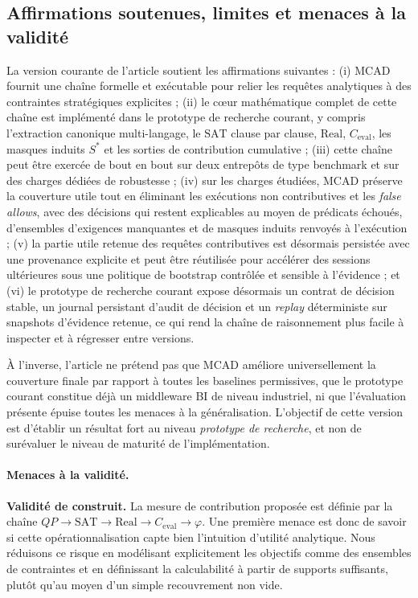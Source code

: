 \documentclass[journal]{IEEEtran}
\begin{document}
\subsection{Affirmations soutenues, limites et menaces à la validité}

La version courante de l'article soutient les affirmations suivantes : (i) MCAD fournit une chaîne formelle et exécutable pour relier les requêtes analytiques à des contraintes stratégiques explicites ; (ii) le cœur mathématique complet de cette chaîne est implémenté dans le prototype de recherche courant, y compris l'extraction canonique multi-langage, le $\mathrm{SAT}$ clause par clause, $\mathrm{Real}$, $C_{\mathrm{eval}}$, les masques induits $S^*$ et les sorties de contribution cumulative ; (iii) cette chaîne peut être exercée de bout en bout sur deux entrepôts de type benchmark et sur des charges dédiées de robustesse ; (iv) sur les charges étudiées, MCAD préserve la couverture utile tout en éliminant les exécutions non contributives et les \emph{false allows}, avec des décisions qui restent explicables au moyen de prédicats échoués, d'ensembles d'exigences manquantes et de masques induits renvoyés à l'exécution ; (v) la partie utile retenue des requêtes contributives est désormais persistée avec une provenance explicite et peut être réutilisée pour accélérer des sessions ultérieures sous une politique de bootstrap contrôlée et sensible à l'évidence ; et (vi) le prototype de recherche courant expose désormais un contrat de décision stable, un journal persistant d'audit de décision et un \emph{replay} déterministe sur snapshots d'évidence retenue, ce qui rend la chaîne de raisonnement plus facile à inspecter et à régresser entre versions.

À l'inverse, l'article ne prétend pas que MCAD améliore universellement la couverture finale par rapport à toutes les baselines permissives, que le prototype courant constitue déjà un middleware BI de niveau industriel, ni que l'évaluation présente épuise toutes les menaces à la généralisation. L'objectif de cette version est d'établir un résultat fort au niveau \emph{prototype de recherche}, et non de surévaluer le niveau de maturité de l'implémentation.

\paragraph*{Menaces à la validité.}

\textbf{Validité de construit.} La mesure de contribution proposée est définie par la chaîne $QP \rightarrow \mathrm{SAT} \rightarrow \mathrm{Real} \rightarrow C_{\mathrm{eval}} \rightarrow \varphi$. Une première menace est donc de savoir si cette opérationnalisation capte bien l'intuition d'utilité analytique. Nous réduisons ce risque en modélisant explicitement les objectifs comme des ensembles de contraintes et en définissant la calculabilité à partir de supports suffisants, plutôt qu'au moyen d'un simple recouvrement non vide.
\end{document}
